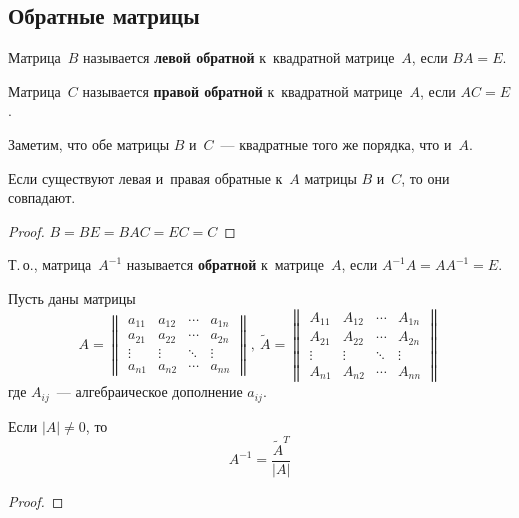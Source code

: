 \subsection{Обратные матрицы}
Матрица~$B$ называется \textbf{левой обратной} к~квадратной матрице~$A$, если $BA = E$.

Матрица~$C$ называется \textbf{правой обратной} к~квадратной матрице~$A$, если $AC = E$.

Заметим, что обе матрицы $B$ и~$C$~--- квадратные того же порядка, что и~$A$.

\begin{statement}
Если существуют левая и~правая обратные к~$A$ матрицы $B$ и~$C$, то они совпадают.
\end{statement}
\begin{proof}
$B = BE = BAC = EC = C$
\end{proof}

Т.\,о., матрица~$A^{-1}$ называется \textbf{обратной} к~матрице~$A$, если $A^{-1} A = A A^{-1} = E$.

\begin{theorem}
Пусть даны матрицы
\begin{equation*}
A =
\begin{Vmatrix}
a_{11} & a_{12} & \cdots & a_{1n} \\
a_{21} & a_{22} & \cdots & a_{2n} \\
\vdots & \vdots & \ddots & \vdots \\
a_{n1} & a_{n2} & \cdots & a_{nn}
\end{Vmatrix}, \ 
\tilde A =
\begin{Vmatrix}
A_{11} & A_{12} & \cdots & A_{1n} \\
A_{21} & A_{22} & \cdots & A_{2n} \\
\vdots & \vdots & \ddots & \vdots \\
A_{n1} & A_{n2} & \cdots & A_{nn}
\end{Vmatrix}
\end{equation*}
где $A_{ij}$~--- алгебраическое дополнение $a_{ij}$.

Если $|A| \neq 0$, то
\begin{equation*}
A^{-1} = \frac{\tilde A^T}{|A|}
\end{equation*}
\end{theorem}
\begin{proof}

\end{proof}

